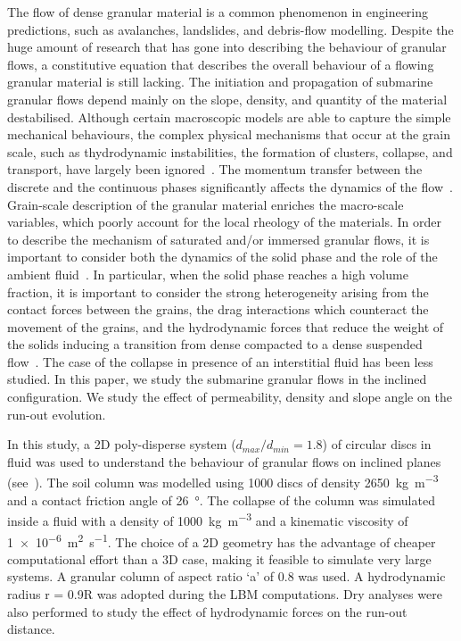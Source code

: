 The flow of dense granular material is a common phenomenon in engineering 
predictions, such as avalanches, landslides, and debris-flow modelling. Despite 
the huge amount of research that has gone into describing the behaviour of 
granular flows, a constitutive equation that describes the overall behaviour of 
a flowing granular material is still lacking. The initiation and propagation of 
submarine granular flows depend mainly on the slope, density, and quantity of 
the material destabilised. Although certain macroscopic models are able to 
capture the simple mechanical behaviours, the complex physical mechanisms that 
occur at the grain scale, such as thydrodynamic instabilities, the formation of 
clusters, collapse, and transport, have largely been ignored~\citep{Topin2011}. 
The momentum transfer between the discrete and the continuous phases 
significantly affects the dynamics of the flow~\citep{Peker2007}. Grain-scale 
description of the granular material enriches the macro-scale variables,  which 
poorly account for the local rheology of the materials.  In order to describe 
the mechanism of saturated and/or immersed granular flows, it is important to 
consider both the dynamics of the solid phase and the role of the ambient 
fluid~\citep{Denlinger2001}. In particular, when the solid phase reaches a high 
volume fraction, it is important to consider the strong heterogeneity arising 
from the contact forces between the grains, the drag interactions which 
counteract the movement of the grains, and the hydrodynamic forces that reduce 
the weight of the solids inducing a transition from dense compacted to a dense 
suspended flow~\citep{Meruane2010}. The case of the collapse in presence of an 
interstitial fluid has been less studied. In this paper, we study the submarine 
granular flows in the inclined configuration. We study the effect of 
permeability, density and slope angle on the run-out evolution.



In this study, a 2D poly-disperse system ($d_{max}/d_{min} = 1.8$) of circular 
discs in fluid was used to understand the behaviour of granular flows on 
inclined planes (see~). The soil column was modelled using 1000 
discs of density \SI{2650}{\kg\per\cubic\meter} and a contact friction angle of 
\SI{26}{\degree}. The collapse of the column was simulated inside a fluid with 
a density of \SI{1000}{\kg\per\cubic\meter}  and a kinematic viscosity of 
\SI{1e-6}{\square\meter\per\second}. The choice of a 2D geometry has the 
advantage of cheaper computational effort than a 3D case, making it feasible to 
simulate very large systems. A granular column of aspect ratio `a' of 0.8 was 
used. A hydrodynamic radius r = 0.9R was adopted during the LBM computations. 
Dry analyses were also performed to study the effect of hydrodynamic forces on 
the run-out distance.


